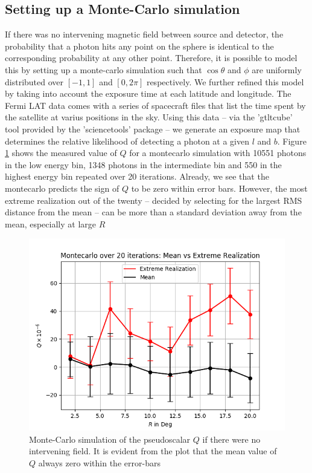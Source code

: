 \documentclass[english]{article}
\begin{document}
\subsection{Setting up a Monte-Carlo simulation}
If there was no intervening magnetic field between source and detector, the
probability that a photon hits any point on the sphere is identical to the
corresponding probability at any other point.
Therefore, it is possible to model this by setting up a monte-carlo simulation
such that $\cos \theta$ and $\phi$ are uniformly distributed over $[-1,1]$ and
$[0,2\pi]$ respectively.
We further refined this model by taking into account the exposure time at each
latitude and longitude.
The Fermi LAT data comes with a series of spacecraft files that list the time
spent by the satellite at varius positions in the sky.
Using this data -- via the 'gtltcube' tool provided by the 
'sciencetools' package -- we generate an exposure map that determines
the relative likelihood of detecting a photon at a given $l$ and $b$.
Figure \ref{fig:montecarlo} shows the measured value of $Q$ for a montecarlo
simulation with 10551 photons in the low energy bin, 1348 photons in the 
intermediate bin and 550 in the highest energy bin repeated over 20 iterations.
Already, we see that the montecarlo predicts the sign of $Q$ to be zero
within error bars.
However, the most extreme realization out of the twenty -- decided by selecting
for the largest RMS distance from the mean -- can be more than a standard
deviation away from the mean, especially at large $R$
\begin{figure}
	\centering
	\includegraphics[scale=0.5]{montecarlo_meanvextreme.png}
	\caption{Monte-Carlo simulation of the pseudoscalar $Q$ if there were no
	intervening field. It is evident from the plot that the mean value of $Q$
	always zero within the error-bars}
	\label{fig:montecarlo}
\end{figure}
\end{document}
